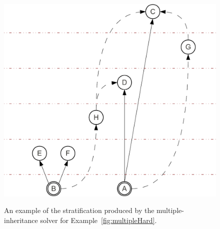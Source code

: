 \begin{figure}[t]
\begin{minipage}[b]{0.5\linewidth}
    \includegraphics[scale=0.4]{figures/complementation/steps-5-crop.pdf}
    \label{fig:multiple:steps:5}
  \end{minipage}
  \caption[Stratification Example]{An example of the stratification
    produced by the multiple-inheritance solver for
    Example~\ref{fig:multipleHard}.}
  \label{fig:multiple:steps}
\end{figure}




